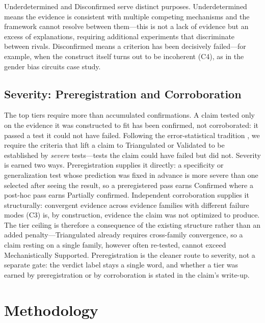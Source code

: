 \documentclass{article}
\begin{document}
Underdetermined and Disconfirmed serve distinct purposes. Underdetermined means the evidence is consistent with multiple competing mechanisms and the framework cannot resolve between them---this is not a lack of evidence but an excess of explanations, requiring additional experiments that discriminate between rivals. Disconfirmed means a criterion has been decisively failed---for example, when the construct itself turns out to be incoherent (C4), as in the gender bias circuits case study.

\subsection{Severity: Preregistration and Corroboration}
\label{sec:severity}

The top tiers require more than accumulated confirmations. A claim tested only on the evidence it was constructed to fit has been confirmed, not corroborated: it passed a test it could not have failed. Following the error-statistical tradition \citep{mayo2018statistical}, we require the criteria that lift a claim to Triangulated or Validated to be established by \emph{severe} tests---tests the claim could have failed but did not. Severity is earned two ways. Preregistration supplies it directly: a specificity or generalization test whose prediction was fixed in advance is more severe than one selected after seeing the result, so a preregistered pass earns Confirmed where a post-hoc pass earns Partially confirmed. Independent corroboration supplies it structurally: convergent evidence across evidence families with different failure modes (C3) is, by construction, evidence the claim was not optimized to produce. The tier ceiling is therefore a consequence of the existing structure rather than an added penalty---Triangulated already requires cross-family convergence, so a claim resting on a single family, however often re-tested, cannot exceed Mechanistically Supported. Preregistration is the cleaner route to severity, not a separate gate: the verdict label stays a single word, and whether a tier was earned by preregistration or by corroboration is stated in the claim's write-up.

\section{Methodology}
\label{sec:methodology}
\end{document}

